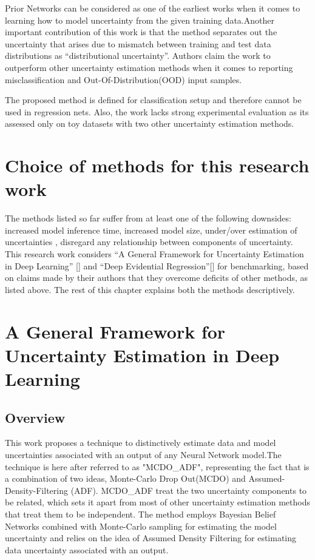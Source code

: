 	 Prior Networks can be considered as one of the earliest works when it comes to learning how to model uncertainty from the given training data.Another important contribution of this work is that the method separates out the uncertainty that arises due to mismatch between training and test data distributions as \enquote{distributional uncertainty}. Authors claim the work to outperform other uncertainty estimation methods when it comes to reporting misclassification and Out-Of-Distribution(OOD) input samples.
	
	
	The proposed method is defined for classification setup and therefore cannot be used in regression nets. Also, the work lacks strong experimental evaluation as its assessed only on toy datasets with two other uncertainty estimation methods.
	
	\section{Choice of methods for this research work}
	The methods listed so far suffer from at least one of the following downsides: increased model inference time, increased model size, under/over estimation of uncertainties , disregard any relationship between components of uncertainty. This research work considers \enquote{A General Framework for Uncertainty Estimation in Deep Learning} [\cite{loquercio2020a}] and \enquote{Deep Evidential Regression}[\cite{amini2020deep}] for benchmarking, based on claims made by their authors that they overcome deficits of other methods, as listed above. The rest of this chapter explains both the methods descriptively.
	\section{A General Framework for Uncertainty Estimation in Deep Learning}\label{general_framework}
	\subsection{Overview}\label{mcdo_adf_overview}
	This work proposes a technique to distinctively estimate data and model uncertainties associated with an output of any Neural Network model.The technique is here after referred to as "MCDO\_ADF", representing the fact that is a combination of two ideas, Monte-Carlo Drop Out(MCDO) and Assumed-Density-Filtering (ADF). MCDO\_ADF treat the  two uncertainty components to be related, which sets it apart from most of other uncertainty estimation methods that treat them to be independent. The method employs Bayesian Belief Networks combined with Monte-Carlo sampling for estimating the model uncertainty and relies on the idea of Assumed Density Filtering for  estimating data uncertainty associated with an output. 
	

